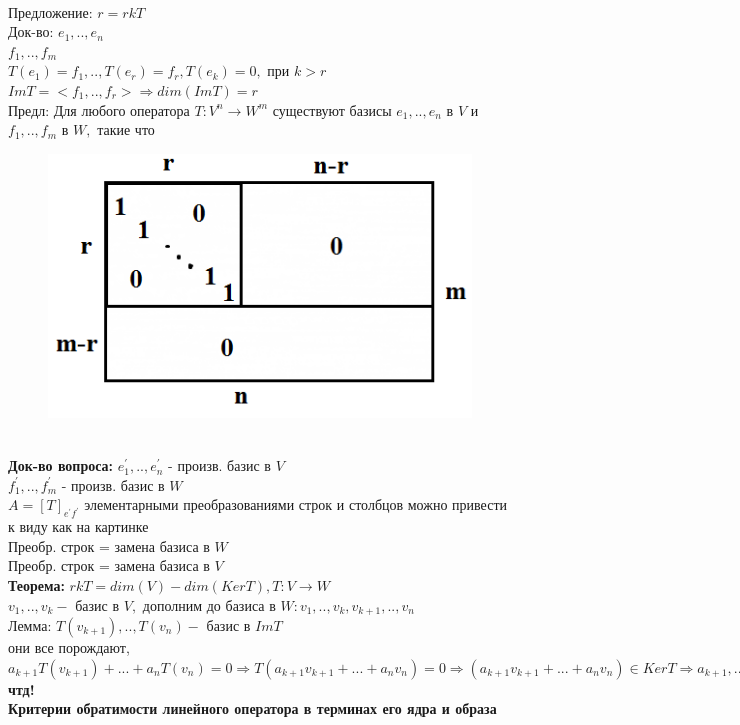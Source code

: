 \documentclass[12pt, oneside]{book}
\theoremstyle{definition}
\begin{document}
\begin{enumerate}
\begin{figure}[h!]
\end{figure}\\
Предложение: $r = rk T$\\
Док-во: $e_1,..,e_n$\\
$f_1,..,f_m$\\
$T(e_1)=f_1,..,T(e_r)=f_r, T(e_k)=0,$ при $k>r$\\
$ImT=<f_1,..,f_r> \Longrightarrow dim(ImT)=r$\\
Предл: Для любого оператора $T: V^n \longrightarrow W^m$ существуют базисы $e_1,..,e_n$ в $V$ и $f_1,..,f_m$ в $W,$ такие что \begin{figure}[h!]
\centering
\includegraphics[scale=0.6]{8-4.PNG}
\end{figure}\\
\textbf{Док-во вопроса:} $e^\prime_1,..,e^\prime_n$ - произв. базис в $V$\\
$f^\prime_1,..,f^\prime_m$ - произв. базис в $W$\\
$A={[T]}_{e^\prime f^\prime}$ элементарными преобразованиями строк и столбцов можно привести к виду как на картинке\\
Преобр. строк = замена базиса в $W$\\
Преобр. строк = замена базиса в $V$\\
\textbf{Теорема:} $rkT=dim(V)-dim(KerT), T:V \longrightarrow W$\\
$v_1,..,v_k -$ базис в $V,$ дополним до базиса в $W:v_1,..,v_k,v_{k+1},..,v_n$\\
Лемма: $T(v_{k+1}),..,T(v_n) -$ базис в $ImT$\\
они все порождают, $a_{k+1}T(v_{k+1})+...+a_nT(v_n)=0 \Longrightarrow T(a_{k+1}v_{k+1}+...+a_nv_n)=0 \Longrightarrow (a_{k+1}v_{k+1}+...+a_nv_n) \in KerT \Longrightarrow a_{k+1},..,a_n=0,$ \textbf{чтд!}\\
\textbf{Критерии обратимости линейного оператора в терминах его ядра и образа}\\

\end{enumerate}
\end{document}
